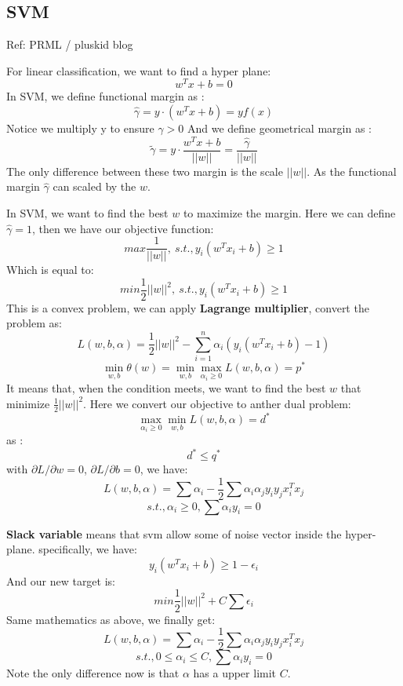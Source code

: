 \documentclass{article}
\begin{document}
\begin{CJK*}{UTF8}{gbsn}
\section{SVM}
Ref: PRML / pluskid blog

For linear classification, we want to find a hyper plane:
$$w^{T}x+b=0$$
In SVM, we define functional margin as :
$$\widehat{\gamma}=y \cdot (w^{T}x+b) = yf(x) $$
Notice we multiply y to ensure $\widehat{\gamma} >0$
And we define geometrical margin as :
$$\widetilde{\gamma}= y \cdot \frac{w^{T}x+b}{||w||} = \frac{\widehat{\gamma}}{||w||} $$
The only difference between these two margin is the scale $||w||$. As the functional margin $\widehat{\gamma}$ can scaled by the $w$. 

In SVM, we want to find the best $w$ to maximize the margin. Here we can define $\widehat{\gamma}=1$, then we have our objective function:
$$max \frac{1}{||w||},\ s.t.,y_{i}(w^{T}x_{i}+b) \ge 1 $$
Which is equal to: 
$$min \frac{1}{2}||w||^{2},\ s.t.,y_{i}(w^{T}x_{i}+b) \ge 1 $$
This is a convex problem, we can apply \textbf{Lagrange multiplier}, convert the problem as:
$$L(w,b,\alpha)=\frac{1}{2}||w||^{2}-\sum_{i=1}^{n}\alpha_{i}(y_{i}(w^{T}x_{i}+b)-1)$$
$$\min \limits_{w,b}\theta(w)=\min \limits_{w,b} \max \limits_{\alpha_{i} \ge 0} L(w,b,\alpha)=p^{*} $$
It means that, when the condition meets, we want to find the best $w$ that minimize $\frac{1}{2}||w||^{2}$. 
Here we convert our objective to anther dual problem:
$$\max \limits_{\alpha_{i} \ge 0} \min \limits_{w,b}  L(w,b,\alpha) =d^{*} $$
as :
$$d^{*} \leq q^{*}$$ 
with $\partial L / \partial w =0 $, $\partial L / \partial b =0 $, we have:
$$L(w,b,\alpha)=\sum \alpha_{i}-\frac{1}{2}\sum \alpha_{i}\alpha_{j}y_{i}y_{j}x_{i}^{T}x_{j}$$
$$s.t., \alpha_{i} \ge 0, \sum \alpha_{i}y_{i}=0 $$

\textbf{Slack variable} means that svm allow some of noise vector inside the hyper-plane. specifically, we have:
$$y_{i}(w^{T}x_{i}+b) \ge 1 - \epsilon_{i}$$
And our new target is: 
$$min \frac{1}{2} ||w||^{2} +C\sum \epsilon_{i}$$
Same mathematics as above, we finally get: 
$$L(w,b,\alpha)=\sum \alpha_{i}-\frac{1}{2}\sum \alpha_{i}\alpha_{j}y_{i}y_{j}x_{i}^{T}x_{j}$$
$$s.t.,  0 \leq \alpha_{i} \leq C, \sum \alpha_{i}y_{i}=0 $$
Note the only difference now is that $\alpha$ has a upper limit $C$. 



\end{CJK*}
\end{document}

